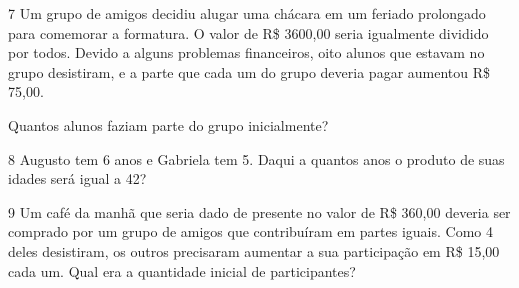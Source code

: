 \num{7} Um grupo de amigos decidiu alugar uma chácara em um feriado
prolongado para comemorar a formatura. O valor de R\$ 3600,00 seria igualmente
dividido por todos. Devido a alguns problemas financeiros, oito alunos
que estavam no grupo desistiram, e a parte que cada um do grupo deveria
pagar aumentou R\$ 75,00.

Quantos alunos faziam parte do grupo inicialmente?

\begin{emptybox}
\vspace{5cm}
\end{emptybox}

\num{8} Augusto tem 6 anos e Gabriela tem 5. Daqui a quantos anos o produto
de suas idades será igual a 42?

\begin{emptybox}
\end{emptybox}

\pagebreak
\num{9} Um café da manhã que seria dado de presente no valor de R\$ 360,00
deveria ser comprado por um grupo de amigos que contribuíram em partes
iguais. Como 4 deles desistiram, os outros precisaram aumentar a sua
participação em R\$ 15,00 cada um. Qual era a quantidade inicial de 
participantes?

